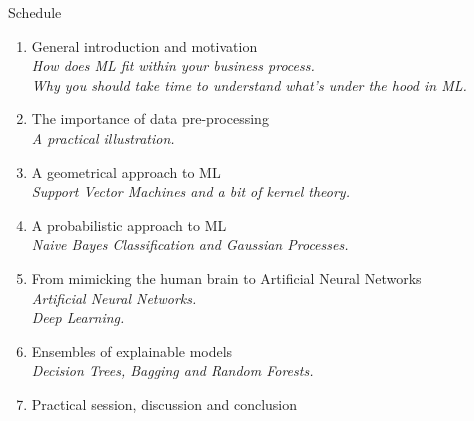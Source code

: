 \documentclass{beamer}
\begin{document}
\begin{frame}{Schedule}
\begin{enumerate}
\item General introduction and motivation \Checkmark \\
{\small \it How does ML fit within your business process.\\
Why you should take time to understand what's under the hood in ML.}
\item The importance of data pre-processing \Checkmark \\
{\small \it A practical illustration.}
\item A geometrical approach to ML \Checkmark \\
{\small \it Support Vector Machines and a bit of kernel theory.}
\item A probabilistic approach to ML \Checkmark \\
{\small \it Naive Bayes Classification and Gaussian Processes.}
\item From mimicking the human brain to Artificial Neural Networks\\
{\small \it Artificial Neural Networks.\\
Deep Learning.}
\item Ensembles of explainable models\\
{\small \it Decision Trees, Bagging and Random Forests.}
\item Practical session, discussion and conclusion
\end{enumerate}
\end{frame}
\end{document}
